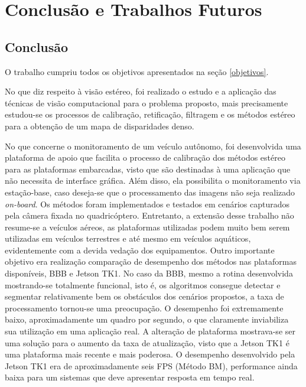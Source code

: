 \chapter{Conclusão e Trabalhos Futuros}
\label{Conclusao}

\section{Conclusão}
O trabalho cumpriu todos os objetivos apresentados na seção \ref{objetivos}. 

No que diz respeito à visão estéreo, foi realizado o estudo e a aplicação das técnicas de visão computacional para o problema proposto, mais precisamente estudou-se os processos de calibração, retificação, filtragem e os métodos estéreo para a obtenção de um mapa de disparidades denso. 

No que concerne o monitoramento de um veículo autônomo, foi desenvolvida uma plataforma de apoio que facilita o processo de calibração dos métodos estéreo para as plataformas embarcadas, visto que são destinadas à uma aplicação que não necessita de interface gráfica. Além disso, ela possibilita o monitoramento via estação-base, caso deseja-se que o processamento das imagens não seja realizado \textit{on-board}. Os métodos foram implementados e testados em cenários capturados pela câmera fixada no quadricóptero. Entretanto, a extensão desse trabalho não resume-se a veículos aéreos, as plataformas utilizadas podem muito bem serem utilizadas em veículos terrestres e até mesmo em veículos aquáticos, evidentemente com a devida vedação dos equipamentos. Outro importante objetivo era realização comparação de desempenho dos métodos nas plataformas disponíveis, BBB e Jetson TK1. No caso da BBB, mesmo a rotina desenvolvida mostrando-se totalmente funcional, isto é, os algoritmos consegue detectar e segmentar relativamente bem os obstáculos dos cenários propostos, a taxa de processamento tornou-se uma preocupação. O desempenho foi extremamente baixo, aproximadamente um quadro por segundo, o que claramente inviabiliza sua utilização em uma aplicação real. A alteração de plataforma mostrava-se ser uma solução para o aumento da taxa de atualização, visto que a Jetson TK1 é uma plataforma mais recente e mais poderosa. O desempenho desenvolvido pela Jetson TK1 era de aproximadamente seis FPS (Método BM), performance ainda baixa para um sistemas que deve apresentar resposta em tempo real.

